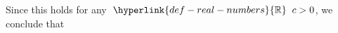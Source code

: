 \documentclass{article}
\newcommand{\RealNumbers}{\mathrel{}\hyperlink{def-real-numbers}{\mathbb{R}}\mathrel{}}
\begin{document}
Since this holds for any $\RealNumbers{c} > 0$, we conclude that
\end{document}
